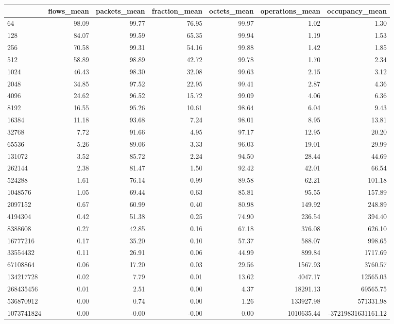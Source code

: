 \begin{tabular}{lrrrrrr}
\toprule
 & flows_mean & packets_mean & fraction_mean & octets_mean & operations_mean & occupancy_mean \\
\midrule
64 & 98.09 & 99.77 & 76.95 & 99.97 & 1.02 & 1.30 \\
128 & 84.07 & 99.59 & 65.35 & 99.94 & 1.19 & 1.53 \\
256 & 70.58 & 99.31 & 54.16 & 99.88 & 1.42 & 1.85 \\
512 & 58.89 & 98.89 & 42.72 & 99.78 & 1.70 & 2.34 \\
1024 & 46.43 & 98.30 & 32.08 & 99.63 & 2.15 & 3.12 \\
2048 & 34.85 & 97.52 & 22.95 & 99.41 & 2.87 & 4.36 \\
4096 & 24.62 & 96.52 & 15.72 & 99.09 & 4.06 & 6.36 \\
8192 & 16.55 & 95.26 & 10.61 & 98.64 & 6.04 & 9.43 \\
16384 & 11.18 & 93.68 & 7.24 & 98.01 & 8.95 & 13.81 \\
32768 & 7.72 & 91.66 & 4.95 & 97.17 & 12.95 & 20.20 \\
65536 & 5.26 & 89.06 & 3.33 & 96.03 & 19.01 & 29.99 \\
131072 & 3.52 & 85.72 & 2.24 & 94.50 & 28.44 & 44.69 \\
262144 & 2.38 & 81.47 & 1.50 & 92.42 & 42.01 & 66.54 \\
524288 & 1.61 & 76.14 & 0.99 & 89.58 & 62.21 & 101.18 \\
1048576 & 1.05 & 69.44 & 0.63 & 85.81 & 95.55 & 157.89 \\
2097152 & 0.67 & 60.99 & 0.40 & 80.98 & 149.92 & 248.89 \\
4194304 & 0.42 & 51.38 & 0.25 & 74.90 & 236.54 & 394.40 \\
8388608 & 0.27 & 42.85 & 0.16 & 67.18 & 376.08 & 626.10 \\
16777216 & 0.17 & 35.20 & 0.10 & 57.37 & 588.07 & 998.65 \\
33554432 & 0.11 & 26.91 & 0.06 & 44.99 & 899.84 & 1717.69 \\
67108864 & 0.06 & 17.20 & 0.03 & 29.56 & 1567.93 & 3760.57 \\
134217728 & 0.02 & 7.79 & 0.01 & 13.62 & 4047.17 & 12565.03 \\
268435456 & 0.01 & 2.51 & 0.00 & 4.37 & 18291.13 & 69565.75 \\
536870912 & 0.00 & 0.74 & 0.00 & 1.26 & 133927.98 & 571331.98 \\
1073741824 & 0.00 & -0.00 & -0.00 & 0.00 & 1010635.44 & -37219831631161.12 \\
\bottomrule
\end{tabular}
